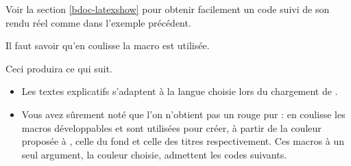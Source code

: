 \begin{bdocrem}
    Voir la section \ref{bdoc-latexshow} pour obtenir facilement un code suivi de son rendu réel comme dans l'exemple précédent.
\end{bdocrem}


\begin{bdocnote}
    Il faut savoir qu'en coulisse la macro  est utilisée.

    \begin{bdoclatex}[std]
    \end{bdoclatex}
\end{bdocnote}




\begin{bdocexa}
    \leavevmode


    Ceci produira ce qui suit.

    \medskip

    
\end{bdocexa}


\begin{bdocnote}
    \leavevmode

    \begin{itemize}
        \item Les textes explicatifs s'adaptent à la langue choisie lors du chargement de .

        \item Vous avez sûrement noté que l'on n'obtient pas un rouge pur : en coulisse les macros développables  et  sont utilisées pour créer, à partir de la couleur proposée à , celle du fond et celle des titres respectivement.
              Ces macros à un seul argument, la couleur choisie, admettent les codes suivants.

              \begin{bdoclatex}[code]

              \end{bdoclatex}
    \end{itemize}
\end{bdocnote}


